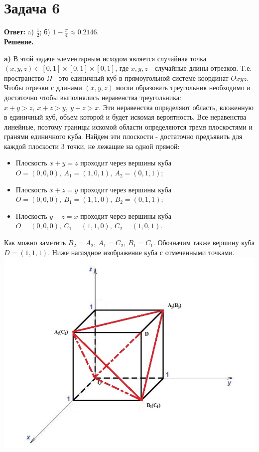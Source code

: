 \documentclass{article}
\begin{document}
\section*{Задача 6}
{\bf Ответ: } a) $\frac{1}{2}$; б) $1-\frac{\pi}{4} \approx 0.2146$.
\\
{\bf Решение.} 
\par
{\bf a)} В этой задаче элементарным исходом является случайная точка $(x,y,z) \in [0, 1]\times[0, 1]\times[0, 1]$, где $x,y,z$ - случайные длины отрезков. Т.е. пространство $\Omega$ - это единичный куб в прямоугольной системе координат $Oxyz$. Чтобы отрезки с длинами $(x,y,z)$ могли образовать треугольник необходимо и достаточно чтобы выполнялись неравенства треугольника: $x + y > z,\ x + z > y,\ y + z > x$. Эти неравенства определяют область, вложенную в единичный куб, объем которой и будет искомая вероятность. Все неравенства линейные, поэтому границы искомой области определяются тремя плоскостями и гранями единичного куба. Найдем эти плоскости - достаточно предъявить для каждой плоскости 3 точки, не лежащие на одной прямой: 
\begin{itemize}
    \item Плоскость $x + y = z$ проходит через вершины куба $O=(0,0,0),\ A_1=(1, 0, 1),\ A_2=(0, 1, 1)$;
    \item Плоскость $x + z = y$ проходит через вершины куба $O=(0,0,0),\ B_1=(1, 1, 0),\ B_2=(0, 1, 1)$;
    \item Плоскость $y + z = x$ проходит через вершины куба $O=(0,0,0),\ C_1=(1, 1, 0),\ C_2=(1, 0, 1)$.
\end{itemize}
\par
Как можно заметить $B_2=A_2,\ A_1=C_2,\ B_1=C_1$. Обозначим также вершину куба $D=(1,1,1)$. Ниже наглядное изображение куба с отмеченными точками.
\\
{\includegraphics[scale=0.6]{img/img2.jpg}}
\end{document}
